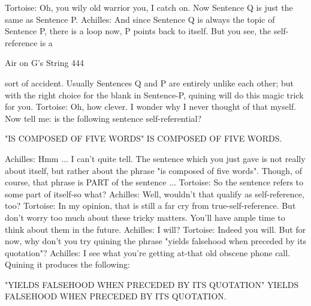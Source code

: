   Tortoise: Oh, you wily old warrior you, I catch on. Now Sentence Q is just the same as
    Sentence P.
  Achilles: And since Sentence Q is always the topic of Sentence P, there is a loop now,
    P points back to itself. But you see, the self-reference is a



Air on G's String                                                                        444

    sort of accident. Usually Sentences Q and P are entirely unlike each other; but with
    the right choice for the blank in Sentence-P, quining will do this magic trick for
    you.
  Tortoise: Oh, how clever. I wonder why I never thought of that myself. Now tell me:
    is the following sentence self-referential?

     "IS COMPOSED OF FIVE WORDS" IS COMPOSED OF FIVE WORDS.

  Achilles: Hmm ... I can't quite tell. The sentence which you just gave is not really
    about itself, but rather about the phrase "is composed of five words". Though, of
    course, that phrase is PART of the sentence ...
  Tortoise: So the sentence refers to some part of itself-so what? Achilles: Well,
    wouldn't that qualify as self-reference, too?
  Tortoise: In my opinion, that is still a far cry from true-self-reference. But don't worry
    too much about these tricky matters. You'll have ample time to think about them in
    the future. Achilles: I will?
  Tortoise: Indeed you will. But for now, why don't you try quining the phrase "yields
    falsehood when preceded by its quotation"?
  Achilles: I see what you're getting at-that old obscene phone call. Quining it produces
    the following:

     "YIELDS FALSEHOOD WHEN PRECEDED BY ITS QUOTATION"
     YIELDS FALSEHOOD WHEN PRECEDED BY ITS QUOTATION.

